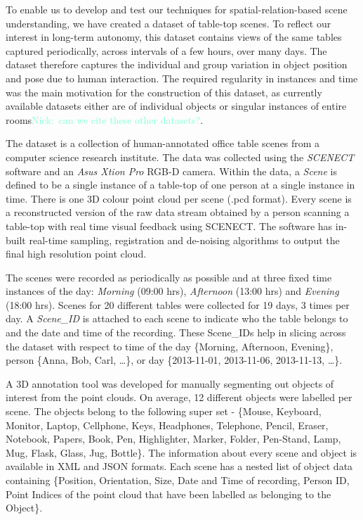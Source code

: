 \documentclass[letterpaper]{article}
\newcommand{\nick}[1]{\textcolor{Aquamarine}{Nick:\ #1}}
\newcommand{\nick}[1]{}
\begin{document}
To enable us to develop and test our techniques for spatial-relation-based scene understanding, we have created a dataset of table-top scenes. To reflect our interest in long-term autonomy, this dataset contains views of the same tables captured periodically, across intervals of a few hours, over many days. The dataset therefore captures the individual and group variation in object position and pose due to human interaction. The required regularity in instances and time was the main motivation for the construction of this dataset, as currently available datasets either are of individual objects or singular instances of entire rooms\nick{can we cite these other datasets?}. 


The dataset is a collection of human-annotated office table scenes from a computer science research institute. The data was collected using the \textit{SCENECT} software \cite{Buerkler:Online2012} and an \textit{Asus Xtion Pro} RGB-D camera. Within the data, a \textit{Scene} is defined to be a single instance of a table-top of one person at a single instance in time. There is one 3D colour point cloud per scene (.pcd format). Every scene is a reconstructed version of the raw data stream obtained by a person scanning a table-top with real time visual feedback using SCENECT. The software has in-built real-time sampling, registration and de-noising algorithms to output the final high resolution point cloud.

The scenes were recorded as periodically as possible and at three fixed time instances of the day: \emph{Morning} (09:00 hrs), \emph{Afternoon} (13:00 hrs) and \emph{Evening} (18:00 hrs). Scenes for 20 different tables were collected for 19 days, 3 times per day. A \textit{Scene\_ID} is attached to each scene to indicate who the table belongs to and the date and time of the recording. These Scene\_IDs help in slicing across the dataset with respect to time of the day \{Morning, Afternoon, Evening\}, person \{Anna, Bob, Carl, \dots\}, or day \{2013-11-01, 2013-11-06, 2013-11-13, \dots\}.

A 3D annotation tool was developed for manually segmenting out objects of interest from the point clouds. On average, 12 different objects were labelled per scene. The objects belong to the following super set - \{Mouse, Keyboard, Monitor, Laptop, Cellphone, Keys, Headphones, Telephone, Pencil, Eraser, Notebook, Papers,  Book, Pen, Highlighter, Marker, Folder, Pen-Stand, Lamp, Mug, Flask, Glass, Jug, Bottle\}. The information about every scene and object is available in  XML and JSON formats. Each scene has a nested list of object data containing \{Position, Orientation, Size, Date and Time of recording, Person ID, Point Indices of the point cloud that have been labelled as belonging to the Object\}.
\end{document}
